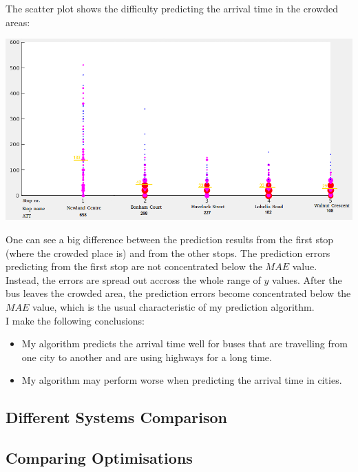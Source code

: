 \documentclass[12pt,a4paper,oneside,openright]{report}
\begin{document}
The scatter plot shows the difficulty predicting the arrival time in the crowded areas:

\includegraphics[width=\textwidth]{figs/worst_scatter_plot.png}

One can see a big difference between the prediction results from the first stop (where the
crowded place is) and from the other stops. The prediction errors predicting from
the first stop are not concentrated below the $MAE$ value. Instead, the errors are spread out
accross the whole range of $y$ values. After the bus leaves the crowded area, the prediction
errors become concentrated below the $MAE$ value, which is the usual characteristic of my
prediction algorithm. \\

I make the following conclusions:

\begin{itemize}

    \item My algorithm predicts the arrival time well for buses that are travelling from one city
    to another and are using highways for a long time.

    \item My algorithm may perform worse when predicting the arrival time in cities.


\end{itemize}



\newpage

\subsection{Different Systems Comparison}

\subsection*{Comparing Optimisations}
\end{document}
